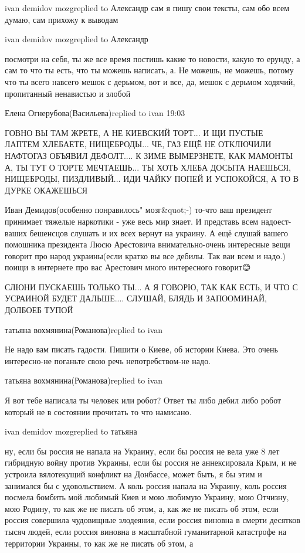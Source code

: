 ivan demidov mozgreplied to Александр
сам я пишу свои тексты, сам обо всем думаю, сам прихожу к выводам

ivan demidov mozgreplied to Александр

посмотри на себя, ты же все время постишь какие то новости, какую то ерунду, а
сам то что ты есть, что ты можешь написать, а. Не можешь, не можешь, потому что
ты всего навсего мешок с дерьмом, вот и все, да, мешок с дерьмом ходячий,
пропитанный ненавистью и злобой

Елена Огнерубова(Васильева)replied to ivan
19:03

ГОВНО ВЫ ТАМ ЖРЕТЕ, А НЕ КИЕВСКИЙ ТОРТ... И ЩИ ПУСТЫЕ ЛАПТЕМ ХЛЕБАЕТЕ,
НИЩЕБРОДЫ... ЧЕ, ГАЗ ЕЩЁ НЕ ОТКЛЮЧИЛИ🤣🤣🤣НАФТОГАЗ ОБЪЯВИЛ ДЕФОЛТ.... К ЗИМЕ
ВЫМЕРЗНЕТЕ, КАК МАМОНТЫ🤣🤣🤣А, ТЫ ТУТ О ТОРТЕ МЕЧТАЕШЬ... ТЫ ХОТЬ ХЛЕБА ДОСЫТА
НАЕШЬСЯ, НИЩЕБРОДЫ, ПИЗДЛИВЫЙ... ИДИ ЧАЙКУ ПОПЕЙ И УСПОКОЙСЯ, А ТО В ДУРКЕ
ОКАЖЕШЬСЯ🤣🤣🤣


Иван Демидов(особенно понравилось" мозг&quot;-) то-что ваш президент принимает
тяжелые наркотики - уже весь мир знает. И представь всем надоест- ваших
бешенсцов слушать и их всех вернут на украину. А ещё слушай вашего помошника
президента Люсю Арестовича внимательно-очень интересные вещи говорит про народ
украины(если кратко вы все дебилы. Так ваи всем и надо.) поищи в интернете про
вас Арестович много интересного говорит😊


СЛЮНИ ПУСКАЕШЬ ТОЛЬКО ТЫ... А Я ГОВОРЮ, ТАК КАК ЕСТЬ, И ЧТО С УСРАИНОЙ БУДЕТ
ДАЛЬШЕ.... СЛУШАЙ, БЛЯДЬ И ЗАПООМИНАЙ, ДОЛБОЕБ ТУПОЙ

татьяна вохмянина(Романова)replied to ivan

Не надо вам писать гадости. Пишити о Киеве, об истории Киева. Это очень
интересно-не поганьте свою речь непотребством-не надо.

татьяна вохмянина(Романова)replied to ivan

Я вот тебе написала ты человек или робот? Ответ ты либо дебил либо робот
который не в состоянии прочитать то что намисано.

ivan demidov mozgreplied to татьяна

ну, если бы россия не напала на Украину, если бы россия не вела уже 8 лет
гибридную войну против Украины, если бы россия не аннексировала Крым, и не
устроила вялотекущий конфликт на Донбассе, может быть, я бы этим и занимался бы
с удовольствием. А коль россия напала на Украину, коль россия посмела бомбить
мой любимый Киев и мою любимую Украину, мою Отчизну, мою Родину, то как же не
писать об этом, а, как же не писать об этом, если россия совершила чудовищные
злодеяния, если россия виновна в смерти десятков тысяч людей, если россия
виновна в масштабной гуманитарной катастрофе на территории Украины, то как же
не писать об этом, а

